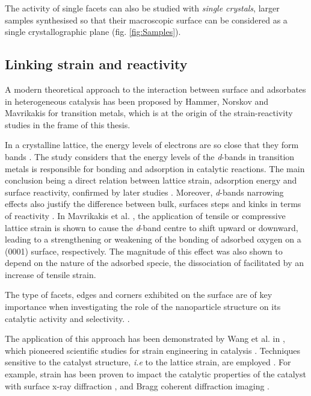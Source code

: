The activity of single facets can also be studied with \textit{single crystals}, larger samples synthesised so that their macroscopic surface can be considered as a single crystallographic plane (fig. \ref{fig:Samples}).

\subsection{Linking strain and reactivity}

A modern theoretical approach to the interaction between surface and adsorbates in heterogeneous catalysis has been proposed by Hammer, Norskov and Mavrikakis \parencite*{Hammer1995, Mavrikakis1998, Hammer2000} for transition metals, which is at the origin of the strain-reactivity studies in the frame of this thesis.

In a crystalline lattice, the energy levels of electrons are so close that they form bands \parencite{Ashcroft76}.
The study considers that the energy levels of the \textit{d}-bands in transition metals is responsible for bonding and adsorption in catalytic reactions.
The main conclusion being a direct relation between lattice strain, adsorption energy and surface reactivity, confirmed by later studies \parencite{Jakob2001, Kitchin2004, Kibler2005, Gsell1998, Ontaneda2015, Weissmuller2019}.
Moreover, \textit{d}-bands narrowing effects also justify the difference between bulk, surfaces steps and kinks in terms of reactivity \parencite{Haydock1972, Desjonqueres1975, Egelhoff1987, Hammer2006, Khorshidi2018}.
In Mavrikakis et al. \parencite*{Mavrikakis1998}, the application of tensile or compressive lattice strain is shown to cause the \textit{d}-band centre to shift upward or downward, leading to a strengthening or weakening of the bonding of adsorbed oxygen on a  (0001) surface, respectively.
The magnitude of this effect was also shown to depend on the nature of the adsorbed specie, the dissociation of  facilitated by an increase of tensile strain.

The type of facets, edges and corners exhibited on the surface are of key importance when investigating the role of the nanoparticle structure on its catalytic activity and selectivity. \parencite{Abuin2019}.

The application of this approach has been demonstrated by Wang et al. in \cite*{Wang2016}, which pioneered scientific studies for strain engineering in catalysis \parencite{NilssonPingel2018}.
Techniques sensitive to the catalyst structure, \textit{i.e} to the lattice strain, are employed \parencite{Somorjai1991}.
For example, strain has been proven to impact the catalytic properties of the catalyst with surface x-ray diffraction \parencite{Resta2020a}, and Bragg coherent diffraction imaging \parencite{Ulvestad2016, Kim2019, Bjorling2019, Passos2020, Carnis2021a, Carnis2021b, Dupraz2022}.
